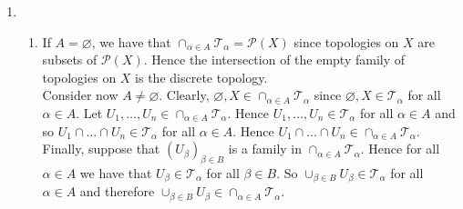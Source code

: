 \begin{enumerate}[label = \textbf{Exercise \arabic*.},wide = 0pt, itemsep = 1.5ex]
\begin{enumerate}[label = \textbf{\alph*.},wide = 0pt, itemsep = 1.5ex]
				\begin{proof}
					We show first that $\lambda(A^c) = 0$. First observe that $(E_n)_{n \in \mathbb{N}}$ is a decreasing sequence of $\lambda$-measurable sets. Moreover, for any $n \in \mathbb{N}$ we have that 
					\begin{equation*}
						\lambda(E_n) \leq \frac{1}{n}\sum_{k \in \mathbb{N}}\frac{1}{2^{k-1}} = \frac{1}{n}\sum_{k \in \mathbb{N}_0}\frac{1}{2^{k}} = \frac{2}{n} < \infty 
					\end{equation*}
					\noindent by subadditivity of the measure. Elementary measure theory now tells us that
					\begin{equation*}
						\lambda(A^c) = \lambda(E) = \lambda\del[1]{\cap_{n \in \mathbb{N}} E_n} = \lim_{n \to \infty}\lambda(E_n) \leq \lim_{n \to \infty} \frac{2}{n} = 0. 	
					\end{equation*}
					Let us show that $A$ is meager. Since $A = E^c = \cup_{n \in \mathbb{N}} E_n^c$, we show that $E_n^c$ is nowhere dense for all $n \in \mathbb{N}$. By part \textbf{a.} we can also show that $\mathbb{R} \setminus \wbar{E_n^c}$ is dense in $\mathbb{R}$. For fixed $n \in \mathbb{N}$ we have that
					\begin{equation*}
						E_n^c = \bigcap_{k \in \mathbb{N}}\del[3]{\intoc[2]{-\infty, x_k - \frac{1}{2^kn}} \cup \intco[2]{x_k + \frac{1}{2^kn},\infty}}.
					\end{equation*}
					Thus $E_n^c$ is a closed set (finite unions and countable intersection of closed intervals) and so $\wbar{E_n^c} = E_n^c$. So $\mathbb{R} \setminus \wbar{E_n^c} = E_n$. But $\mathbb{Q} \subseteq E_n$ for all $n \in \mathbb{N}$ and thus $E_n$ is dense in $\mathbb{R}$.
				\end{proof}
		\end{enumerate}
	\item
		~
		\begin{enumerate}[label = \textbf{\alph*.},wide = 0pt, itemsep = 1.5ex]
			\item If $A = \varnothing$, we have that $\cap_{\alpha \in A} \mathcal{T}_\alpha = \mathcal{P}(X)$ since topologies on $X$ are subsets of $\mathcal{P}(X)$. Hence the intersection of the empty family of topologies on $X$ is the discrete topology.\\
				Consider now $A \neq \varnothing$. Clearly, $\varnothing, X \in \cap_{\alpha \in A} \mathcal{T}_\alpha$ since $\varnothing,X \in \mathcal{T}_{\alpha}$ for all $\alpha \in A$. Let $U_1,\dots,U_n \in \cap_{\alpha \in A}\mathcal{T}_\alpha$. Hence $U_1,\dots,U_n \in \mathcal{T}_\alpha$ for all $\alpha \in A$ and so $U_1 \cap \dots \cap U_n \in \mathcal{T}_\alpha$ for all $\alpha \in A$. Hence $U_1 \cap \dots \cap U_n \in \cap_{\alpha \in A}\mathcal{T}_\alpha$. Finally, suppose that $(U_\beta)_{\beta \in B}$ is a family in $\cap_{\alpha \in A} \mathcal{T}_\alpha$. Hence for all $\alpha \in A$ we have that $U_\beta \in \mathcal{T}_\alpha$ for all $\beta \in B$. So $\cup_{\beta \in B} U_\beta \in \mathcal{T}_\alpha$ for all $\alpha \in A$ and therefore $\cup_{\beta \in B} U_\beta \in \cap_{\alpha \in A} \mathcal{T}_\alpha$.

\end{enumerate}
\end{enumerate}
